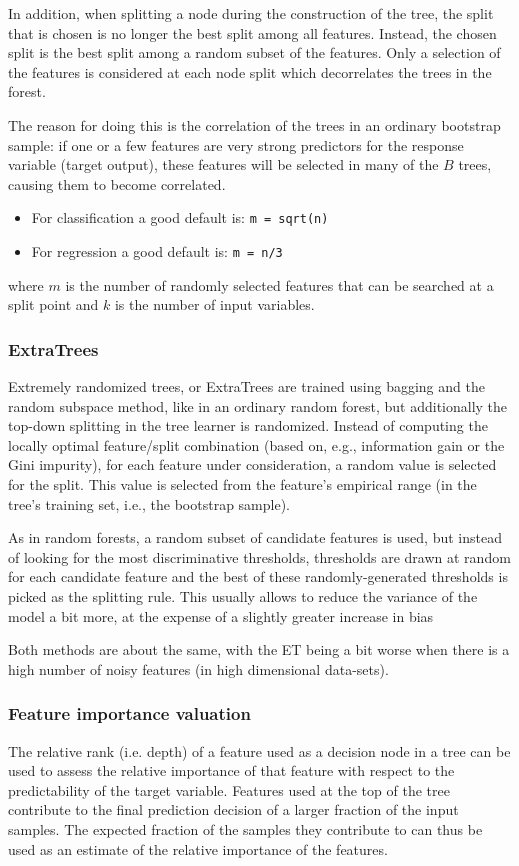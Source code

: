 \documentclass[11pt]{article}
\theoremstyle{plain}
\theoremstyle{definition}
\begin{document}
In addition, when splitting a node during the construction of the tree, the split that is chosen is no longer the best split among all features. Instead, the chosen split is the best split among a random subset of the features.  Only a selection of the features is considered at each node split which decorrelates the trees in the forest.

The reason for doing this is the correlation of the trees in an ordinary bootstrap sample: if one or a few features are very strong predictors for the response variable (target output), these features will be selected in many of the $B$ trees, causing them to become correlated.

\begin{itemize}
	\item For classification a good default is: \verb|m = sqrt(n)|
	\item For regression a good default is: \verb|m = n/3|
\end{itemize}
where $m$ is the number of randomly selected features that can be searched at a split point and $k$ is the number of input variables.


\subsubsection{ExtraTrees}
Extremely randomized trees, or ExtraTrees are trained using bagging and the random subspace method, like in an ordinary random forest, but additionally the top-down splitting in the tree learner is randomized. Instead of computing the locally optimal feature/split combination (based on, e.g., information gain or the Gini impurity), for each feature under consideration, a random value is selected for the split. This value is selected from the feature's empirical range (in the tree's training set, i.e., the bootstrap sample).


As in random forests, a random subset of candidate features is used, but instead of looking for the most discriminative thresholds, thresholds are drawn at random for each candidate feature and the best of these randomly-generated thresholds is picked as the splitting rule. This usually allows to reduce the variance of the model a bit more, at the expense of a slightly greater increase in bias

Both methods are about the same, with the ET being a bit worse when there is a high number of noisy features (in high dimensional data-sets).


\subsubsection{Feature importance valuation}
The relative rank (i.e. depth) of a feature used as a decision node in a tree can be used to assess the relative importance of that feature with respect to the predictability of the target variable. Features used at the top of the tree contribute to the final prediction decision of a larger fraction of the input samples. The expected fraction of the samples they contribute to can thus be used as an estimate of the relative importance of the features.
\end{document}
